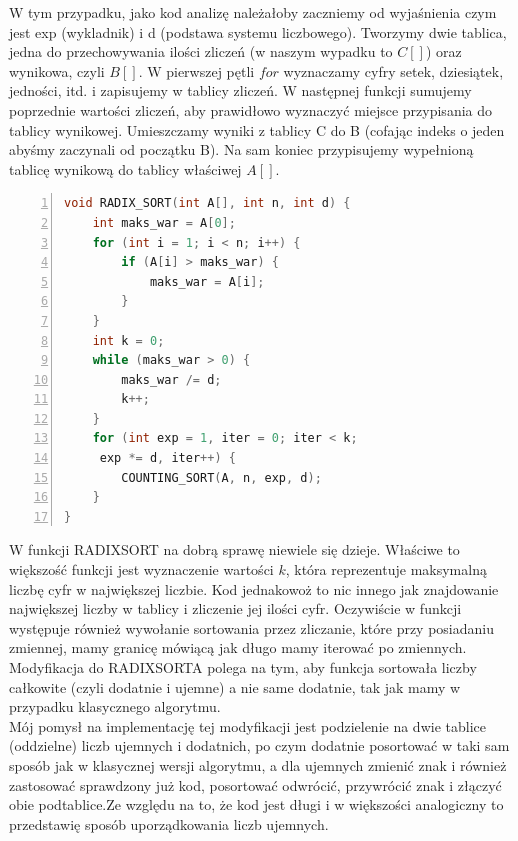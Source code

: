 \documentclass{article}
\begin{document}
\large{W tym przypadku, jako kod analizę należałoby zaczniemy od wyjaśnienia czym jest exp (wykladnik) i d (podstawa systemu liczbowego). Tworzymy dwie tablica, jedna do przechowywania ilości zliczeń (w naszym wypadku to $C[]$) oraz wynikowa, czyli $B[]$. W pierwszej pętli $for$ wyznaczamy cyfry setek, dziesiątek, jedności, itd. i zapisujemy w tablicy zliczeń. W następnej funkcji sumujemy poprzednie wartości zliczeń, aby prawidłowo wyznaczyć miejsce przypisania do tablicy wynikowej. Umieszczamy wyniki z tablicy C do B (cofając indeks o jeden abyśmy zaczynali od początku B). Na sam koniec przypisujemy wypełnioną tablicę wynikową do tablicy właściwej $A[]$.}

\begin{lstlisting}[language=C++, caption={Kod funkcji sortowania pozycyjnego}, numbers=left, frame=single, xleftmargin=20pt]
void RADIX_SORT(int A[], int n, int d) {
	int maks_war = A[0];
	for (int i = 1; i < n; i++) {
		if (A[i] > maks_war) {
			maks_war = A[i];
		}
	}
	int k = 0;
	while (maks_war > 0) {
		maks_war /= d;
		k++;
	}
	for (int exp = 1, iter = 0; iter < k;
	 exp *= d, iter++) {
		COUNTING_SORT(A, n, exp, d);
	}
}
\end{lstlisting}

\large{W funkcji RADIXSORT na dobrą sprawę niewiele się dzieje. Właściwe to większość funkcji jest wyznaczenie wartości $k$, która reprezentuje maksymalną liczbę cyfr w największej liczbie. Kod jednakowoż to nic innego jak znajdowanie największej liczby w tablicy i zliczenie jej ilości cyfr. Oczywiście w funkcji występuje również wywołanie sortowania przez zliczanie, które przy posiadaniu zmiennej, mamy granicę mówiącą jak długo mamy iterować po zmiennych.}\\

\large{Modyfikacja do RADIXSORTA polega na tym, aby funkcja sortowała liczby całkowite (czyli dodatnie i ujemne) a nie same dodatnie, tak jak mamy w przypadku klasycznego algorytmu.}\\

\large{Mój pomysł na implementację tej modyfikacji jest podzielenie na dwie tablice (oddzielne) liczb ujemnych i dodatnich, po czym dodatnie posortować w taki sam sposób jak w klasycznej wersji algorytmu, a dla ujemnych zmienić znak i również zastosować sprawdzony już kod, posortować odwrócić, przywrócić znak i złączyć obie podtablice.Ze względu na to, że kod jest długi i w większości analogiczny to przedstawię sposób uporządkowania liczb ujemnych.}
\end{document}
